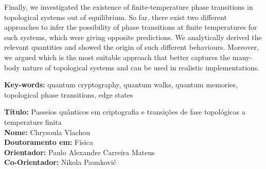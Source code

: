 \documentclass[12pt]{report}
\begin{document}
Finally, we investigated the existence of finite-temperature phase transitions in topological systems out of equilibrium. So far, there exist two different approaches to infer the possibility of phase transitions  at finite temperatures for such systems, which were giving opposite predictions. We analytically derived the relevant quantities and showed the origin of such different behaviours. Moreover, we argued which is the most suitable approach that better captures the many-body nature of topological systems and can be used in realistic implementations.

\vfill

\begin{flushleft}
\textbf{Key-words:} quantum cryptography, quantum walks, quantum memories, topological phase transitions,  edge states
\end{flushleft}
\newpage
\noindent \textbf{T\'{i}tulo:} Passeios qu\^{a}nticos em criptografia e transi\c{c}\~{o}es de fase topol\'{o}gicas a temperature finita\\
\textbf{Nome:} Chrysoula Vlachou\\
\textbf{Doutoramento em:} F\'{i}sica\\
\textbf{Orientador:} Paulo Alexandre Carreira Mateus\\
\textbf{Co-Orientador:} Nikola Paunkovi\'c\\
\vspace{2\baselineskip}
\end{document}
